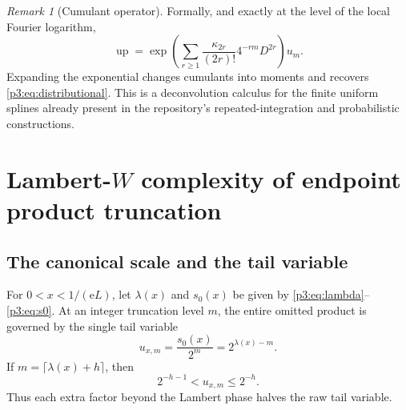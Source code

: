 \documentclass[11pt,oneside]{article}
\numberwithin{equation}{section}
\theoremstyle{definition}
\theoremstyle{remark}
\newtheorem{remark}[theorem]{Remark}
\newcommand{\Up}{\operatorname{up}}
\newcommand{\e}{\mathrm e}
\begin{document}
\begin{remark}[Cumulant operator]
Formally, and exactly at the level of the local Fourier logarithm,
\begin{equation}
 \Up=\exp\!\left(\sum_{r\ge1}
 \frac{\kappa_{2r}}{(2r)!}4^{-rm}D^{2r}\right)u_m.
 \label{p3:eq:cumulant-operator}
\end{equation}
Expanding the exponential changes cumulants into moments and recovers
\eqref{p3:eq:distributional}.  This is a deconvolution calculus for the finite uniform splines
already present in the repository's repeated-integration and probabilistic constructions.
\end{remark}

\section{Lambert-$W$ complexity of endpoint product truncation}
\label{p3:sec:Lambert-complexity}

\subsection{The canonical scale and the tail variable}

For $0<x<1/(\e L)$, let $\lambda(x)$ and $s_0(x)$ be given by
\eqref{p3:eq:lambda}--\eqref{p3:eq:s0}.  At an integer truncation level $m$, the entire omitted
product is governed by the single tail variable
\begin{equation}
 u_{x,m}=\frac{s_0(x)}{2^m}=2^{\lambda(x)-m}.
 \label{p3:eq:uxm}
\end{equation}
If $m=\lceil\lambda(x)+h\rceil$, then
\begin{equation}
 2^{-h-1}<u_{x,m}\le2^{-h}.
 \label{p3:eq:u-window}
\end{equation}
Thus each extra factor beyond the Lambert phase halves the raw tail variable.
\end{document}

